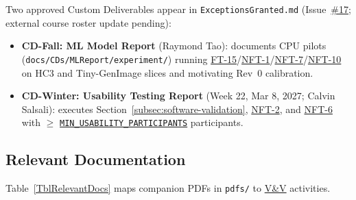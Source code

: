 \documentclass[12pt, titlepage]{article}
\newcommand{\MinUsabilityParticipants}{\hyperref[const:MIN_USABILITY_PARTICIPANTS]{\texttt{MIN\_\allowbreak{}USABILITY\_\allowbreak{}PARTICIPANTS}}}
\newcommand{\VnV}{\hyperlink{vnv-acr-vnv}{V\&V}}
\begin{document}
Two approved Custom Deliverables appear in \texttt{ExceptionsGranted.md} (Issue~\href{https://github.com/richy1337/Verity/issues/17}{\#17}; external course roster update pending):
\begin{itemize}[leftmargin=*, itemsep=0.5pt, topsep=2pt]
    \item \textbf{CD-Fall: ML Model Report} \cite{VerityMLReport2026} (Raymond Tao): documents CPU pilots (\texttt{docs/\allowbreak{}CDs/\allowbreak{}MLReport/\allowbreak{}experiment/}) running \hyperref[test:FT-15]{FT-15}/\hyperref[test:NFT-1]{NFT-1}/\hyperref[test:NFT-7]{NFT-7}/\hyperref[test:NFT-10]{NFT-10} on HC3 and Tiny-GenImage slices and motivating Rev~0 calibration.
    \item \textbf{CD-Winter: Usability Testing Report} (Week 22, Mar 8, 2027; Calvin Salsali): executes Section~\ref{subsec:software-validation}, \hyperref[test:NFT-2]{NFT-2}, and \hyperref[test:NFT-6]{NFT-6} with $\ge$ \MinUsabilityParticipants{} participants.
\end{itemize}

\subsection{Relevant Documentation}\label{subsec:relevant-docs}

Table~\ref{TblRelevantDocs} maps companion PDFs in \texttt{pdfs/} to \VnV{} activities.
\end{document}
